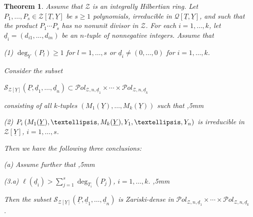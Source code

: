 \documentclass[10pt,a4paper]{amsart}
\newtheorem{thm}{Theorem}
\begin{document}
\begin{thm} \label{thm:main3}
Assume that ${\mathcal Z}$ is an integrally Hilbertian ring.
Let $P_1,\ldots,P_s \in {\mathcal Z}[\underline{T},\underline{Y}]$ be $s\geq 1$ polynomials, irreducible in $\mathcal{Q}[\underline{T},\underline{Y}]$, and such that the product $P_1\cdots P_s$ has no nonunit divisor in ${\mathcal Z}$.
For each $i=1,\ldots,k$, let ${\underline d}_i=(d_{i1},\ldots,d_{in})$ be an $n$-tuple of nonnegative integers. Assume that \vskip 1mm

\noindent
{\rm (1)} $\deg_{\underline Y}(P_l) \geq 1$ for $l=1,\ldots,s$ or ${\underline d}_i \not= (0,\ldots,0)$ for $i=1,\ldots,k$. 
\vskip 2mm 

\noindent
Consider the subset
\vskip 1mm

\centerline{${\mathcal S}_{{\mathcal Z}[\underline Y]}(\underline P,{\underline d}_1,\ldots,{\underline d}_n) \subset {\mathcal P}ol_{{\mathcal Z},n,\underline{d}_1} \times \cdots \times {\mathcal P}ol_{{\mathcal Z},n,\underline{d}_k}$} 
\vskip 2mm

\noindent
consisting of all $k$-tuples $(M_1(\underline Y), \ldots, M_k(\underline Y))$ such that   ,5mm

\noindent
{\rm (2)} \hskip 10mm $P_i\hskip 2pt (M_1(\underline Y), \ldots, M_k(\underline Y),Y_1, \ldots, Y_n)$
is irreducible in ${\mathcal Z}[\underline Y]$, $i=1,\ldots, s$.

\vskip 2mm

\noindent
Then we have the following three conclusions:
\vskip 1mm


\noindent
{\rm (a)} Assume further that
,5mm

\noindent
{\rm (3.a)} \hskip 25mm $\ell({\underline d}_i)> \sum_{j=1}^s \deg_{T_i}(P_j)$, \hskip 3mm $i=1,\ldots,k$.
,5mm

\noindent
Then the subset ${\mathcal S}_{{\mathcal Z}[\underline Y]}(\underline P,{\underline d}_1,\ldots,{\underline d}_n)$ is Zariski-dense in ${\mathcal P}ol_{{\mathcal Z},n,\underline{d}_1} \times \cdots \times {\mathcal P}ol_{{\mathcal Z},n,\underline{d}_k}$.




\vskip 2mm


\end{thm}
\end{document}
